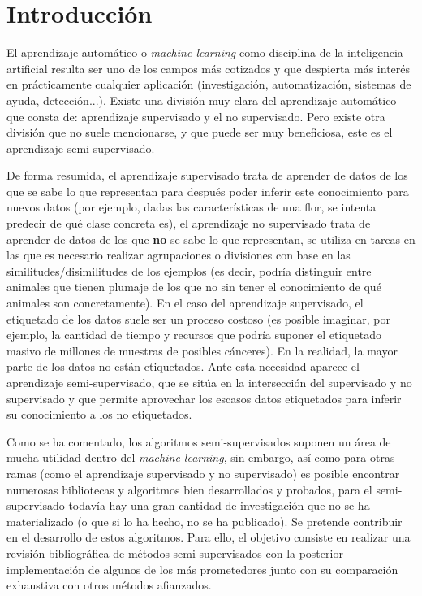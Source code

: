 
\newpage
\chapter{Introducción}
\label{introduccion}

El aprendizaje automático o \textit{machine learning} como disciplina de la inteligencia artificial resulta ser uno de los campos más cotizados y que despierta más interés en prácticamente cualquier aplicación (investigación, automatización, sistemas de ayuda, detección...). Existe una división muy clara del aprendizaje automático que consta de: aprendizaje supervisado y el no supervisado. Pero existe otra división que no suele mencionarse, y que puede ser muy beneficiosa, este es el aprendizaje semi-supervisado.

De forma resumida, el aprendizaje supervisado trata de aprender de datos de los que se sabe lo que representan para después poder inferir este conocimiento para nuevos datos (por ejemplo, dadas las características de una flor, se intenta predecir de qué clase concreta es), el aprendizaje no supervisado trata de aprender de datos de los que \textbf{no} se sabe lo que representan, se utiliza en tareas en las que es necesario realizar agrupaciones o divisiones con base en las similitudes/disimilitudes de los ejemplos (es decir, podría distinguir entre animales que tienen plumaje de los que no sin tener el conocimiento de qué animales son concretamente). En el caso del aprendizaje supervisado, el etiquetado de los datos suele ser un proceso costoso (es posible imaginar, por ejemplo, la cantidad de tiempo y recursos que podría suponer el etiquetado masivo de millones de muestras de posibles cánceres). En la realidad, la mayor parte de los datos no están etiquetados. Ante esta necesidad aparece el aprendizaje semi-supervisado, que se sitúa en la intersección del supervisado y no supervisado y que permite aprovechar los escasos datos etiquetados para inferir su conocimiento a los no etiquetados.

Como se ha comentado, los algoritmos semi-supervisados suponen un área de mucha utilidad dentro del \textit{machine learning}, sin embargo, así como para otras ramas (como el aprendizaje supervisado y no supervisado) es posible encontrar numerosas bibliotecas y algoritmos bien desarrollados y probados, para el semi-supervisado todavía hay una gran cantidad de investigación que no se ha materializado (o que si lo ha hecho, no se ha publicado). Se pretende contribuir en el desarrollo de estos algoritmos. Para ello, el objetivo consiste en realizar una revisión bibliográfica de métodos semi-supervisados con la posterior implementación de algunos de los más prometedores junto con su comparación exhaustiva con otros métodos afianzados.

